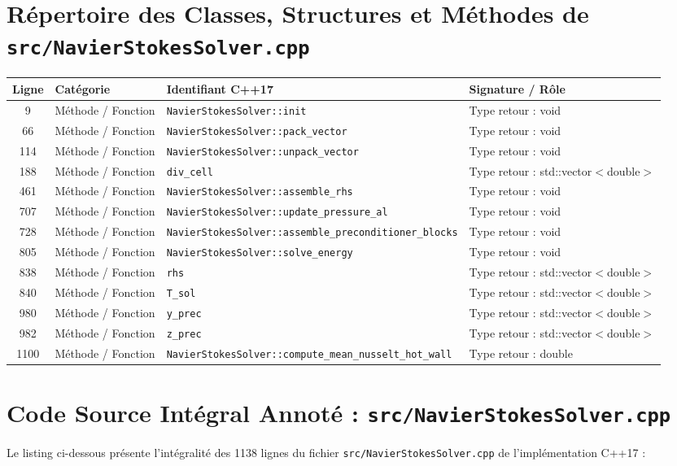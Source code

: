 \documentclass[10pt,a4paper,oneside]{book}
\begin{document}
\section{Répertoire des Classes, Structures et Méthodes de \texttt{src/NavierStokesSolver.cpp}}
\begin{center}\small
\begin{tabular}{clll}
\toprule
\textbf{Ligne} & \textbf{Catégorie} & \textbf{Identifiant C++17} & \textbf{Signature / Rôle} \\
\midrule
9 & Méthode / Fonction & \texttt{NavierStokesSolver::init} & Type retour : void \\
66 & Méthode / Fonction & \texttt{NavierStokesSolver::pack\_vector} & Type retour : void \\
114 & Méthode / Fonction & \texttt{NavierStokesSolver::unpack\_vector} & Type retour : void \\
188 & Méthode / Fonction & \texttt{div\_cell} & Type retour : std::vector$<$double$>$ \\
461 & Méthode / Fonction & \texttt{NavierStokesSolver::assemble\_rhs} & Type retour : void \\
707 & Méthode / Fonction & \texttt{NavierStokesSolver::update\_pressure\_al} & Type retour : void \\
728 & Méthode / Fonction & \texttt{NavierStokesSolver::assemble\_preconditioner\_blocks} & Type retour : void \\
805 & Méthode / Fonction & \texttt{NavierStokesSolver::solve\_energy} & Type retour : void \\
838 & Méthode / Fonction & \texttt{rhs} & Type retour : std::vector$<$double$>$ \\
840 & Méthode / Fonction & \texttt{T\_sol} & Type retour : std::vector$<$double$>$ \\
980 & Méthode / Fonction & \texttt{y\_prec} & Type retour : std::vector$<$double$>$ \\
982 & Méthode / Fonction & \texttt{z\_prec} & Type retour : std::vector$<$double$>$ \\
1100 & Méthode / Fonction & \texttt{NavierStokesSolver::compute\_mean\_nusselt\_hot\_wall} & Type retour : double \\
\bottomrule
\end{tabular}
\end{center}

\section{Code Source Intégral Annoté : \texttt{src/NavierStokesSolver.cpp}}
Le listing ci-dessous présente l'intégralité des 1138 lignes du fichier \texttt{src/NavierStokesSolver.cpp} de l'implémentation C++17 :
\end{document}

